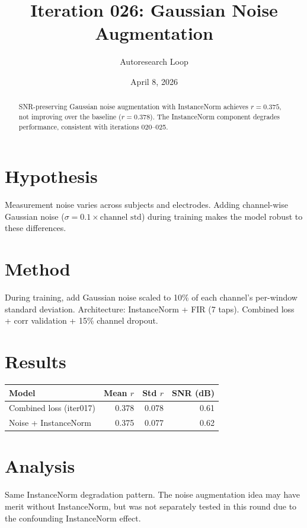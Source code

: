 \documentclass[11pt,a4paper]{article}
\title{Iteration 026: Gaussian Noise Augmentation}
\author{Autoresearch Loop}
\date{April 8, 2026}
\begin{document}
\maketitle

\begin{abstract}
SNR-preserving Gaussian noise augmentation with InstanceNorm achieves $r=0.375$,
not improving over the baseline ($r=0.378$). The InstanceNorm component degrades
performance, consistent with iterations 020--025.
\end{abstract}

\section{Hypothesis}
Measurement noise varies across subjects and electrodes. Adding channel-wise
Gaussian noise ($\sigma = 0.1 \times \text{channel std}$) during training
makes the model robust to these differences.

\section{Method}
During training, add Gaussian noise scaled to 10\% of each channel's
per-window standard deviation. Architecture: InstanceNorm + FIR (7 taps).
Combined loss + corr validation + 15\% channel dropout.

\section{Results}
\begin{table}[H]
\centering
\begin{tabular}{lrrr}
\toprule
Model & Mean $r$ & Std $r$ & SNR (dB) \\
\midrule
Combined loss (iter017) & 0.378 & 0.078 & 0.61 \\
Noise + InstanceNorm & 0.375 & 0.077 & 0.62 \\
\bottomrule
\end{tabular}
\end{table}

\section{Analysis}
Same InstanceNorm degradation pattern. The noise augmentation idea may have
merit without InstanceNorm, but was not separately tested in this round due
to the confounding InstanceNorm effect.
\end{document}
